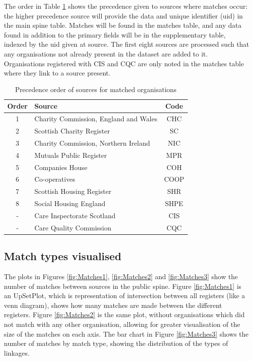 \documentclass{article}
\begin{document}
The  order in Table \ref{tab:order} shows the precedence given to sources where matches occur: the higher precedence
source will provide the data and unique identifier (uid) in the main spine table. Matches will be found in the matches table, and any data
found in addition to the primary fields will be in the supplementary table, indexed by the uid given at source. The first eight sources are processed such that any organisations not already present 
in the dataset are added to it. Organisations registered with CIS and CQC are only noted in the matches table where they link to a source present.

\begin{table}[h]
  \centering
  \begin{tabularx}{\textwidth}{|c|X|c|}
    \hline
Order &	Source & Code \\ \hline \hline
1 &	Charity Commission, England and Wales	& CHC	\\ \hline
2 &	Scottish Charity Register	& SC	\\ \hline
3 &	Charity Commission, Northern Ireland	& NIC	\\ \hline
4 &	Mutuals Public Register 	& MPR	\\ \hline
5 &	Companies House 	& COH	\\ \hline
6 &	Co-operatives 	& COOP	\\ \hline
7 &	Scottish Housing Register 	& SHR	\\ \hline
8 &	Social Housing England 	& SHPE	\\ \hline
- &	Care Inspectorate Scotland 	& CIS	\\ \hline
- &	Care Quality Commission 	& CQC	\\ \hline
\hline

\end{tabularx}
\caption{Precedence order of sources for matched organisations}
\label{tab:order}
\end{table}

\clearpage
\subsection{Match types visualised}
\label{sec:match_vis}

The plots in Figures \ref{fig:Matches1}, \ref{fig:Matches2} and \ref{fig:Matches3} 
show the number of matches between sources in the public spine. 
Figure \ref{fig:Matches1} is an UpSetPlot, which is representation of intersection between all registers (like a venn
 diagram), shows how many matches are made
between the different registers. Figure \ref{fig:Matches2} is the same plot, without organisations which did not match 
with any other organisation, allowing for greater visualisation of the size of the matches on each axis. 
The bar chart in Figure \ref{fig:Matches3} shows the number of matches by match type, 
showing the distribution of the types of linkages.
\end{document}
